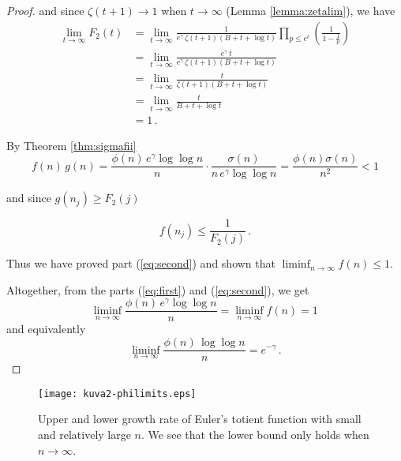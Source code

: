 \documentclass{article}
\begin{document}
\begin{theorem}
\begin{proof}
and since $\zeta(t+1)\rightarrow 1$ when $t\rightarrow\infty$ (Lemma \ref{lemma:zetalim}), we have
\begin{align*}
    \lim_{t \rightarrow \infty} F_2(t) & = \lim_{t \rightarrow \infty} \frac{1}{e^\gamma\,\zeta(t+1)(B+t+\log t)} \prod_{p\leq e^t} \left(\frac{1}{1-\frac{1}{p}}\right)\\
    & = \lim_{t \rightarrow \infty} \frac{e^\gamma\,t}{e^\gamma\,\zeta(t+1)(B+t+\log t)}\\
    & = \lim_{t \rightarrow \infty} \frac{t}{\zeta(t+1)(B+t+\log t)}\\
    & = \lim_{t \rightarrow \infty} \frac{t}{B+t+\log t}\\
    & = 1\,.
\end{align*}

By Theorem \ref{thm:sigmafii}
\begin{equation*}
    f(n)\,g(n) = \frac{\phi(n)\,e^\gamma \log\log n}{n} \cdot \frac{\sigma(n)}{n\,e^\gamma \log\log n} = \frac{\phi(n)\sigma(n)}{n^2}<1
\end{equation*}

and since $g(n_j) \geq F_2(j)$

\begin{equation*}
    f(n_j)\leq \frac{1}{F_2(j)}\,.
\end{equation*}

Thus we have proved part (\ref{eq:second}) and shown that $\liminf_{n \rightarrow \infty}{f(n)\leq 1}$.

Altogether, from the parts (\ref{eq:first}) and (\ref{eq:second}), we get
\begin{equation*}
    \liminf_{n \rightarrow \infty}{\frac{\phi(n)\,e^\gamma \log\log n}{n}}=\liminf_{n \rightarrow \infty}{f(n)}=1\,
\end{equation*}
and equivalently
\begin{equation*}
    \liminf_{n \rightarrow \infty}{\frac{\phi(n)\,\log\log n}{n}}=e^{-\gamma}\,.
\end{equation*}
\end{proof}
\end{theorem}

\begin{figure}[!htb]
    \centering
    \texttt{[image: kuva2-philimits.eps]}
    \caption{Upper and lower growth rate of Euler's totient function with small and relatively large $n$. We see that the lower bound only holds when $n\rightarrow\infty$.}
    \label{fig:k2}
\end{figure}

\clearpage
\nocite{*}
\printbibliography
\end{document}
